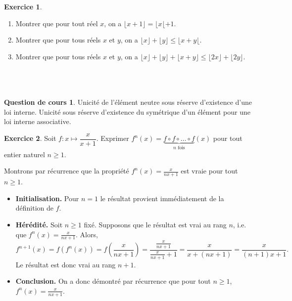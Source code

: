 \documentclass[12pt,a4paper]{amsart}
\theoremstyle{definition}
\newtheorem*{question}{\sc Question de cours}
\newtheorem{exercice}{\sc Exercice}[section]
\begin{document}
\begin{exercice}\leavevmode
	\begin{enumerate}
		\item Montrer que pour tout réel $x$, on a $\lfloor x+1 \rfloor = \lfloor x \lfloor +1$.
		\item Montrer que pour tous réels $x$ et $y$, on a $\lfloor x \rfloor + \lfloor y \rfloor \leqslant \lfloor x +y\lfloor $.
		\item Montrer que pour tous réels $x$ et $y$, on a $\lfloor x \rfloor + \lfloor y \rfloor + \lfloor x+y \rfloor \leqslant \lfloor 2x \rfloor + \lfloor 2y \rfloor$.
	\end{enumerate}
\end{exercice}


~
\newpage
\section{}
\subsection{}

\begin{question}
	Unicité de l'élément neutre sous réserve d'existence d'une loi interne. Unicité sous réserve d'existence du symétrique d'un élément pour une loi interne associative.
\end{question}

\begin{exercice}
	Soit $f\colon x \mapsto \dfrac{x}{x+1}$. Exprimer $f^n(x) = \underbrace{f\circ f \circ \ldots \circ f}_{n\text{ fois}}(x)$ pour tout entier naturel $n \geqslant 1$.
	\end{exercice}
	
	\begin{solution}
	Montrons par récurrence que la propriété $f^n(x) = \frac{x}{nx+1}$ est vraie pour tout $n \geqslant 1$.
	\begin{itemize}
	\item \textbf{Initialisation.} Pour $n=1$ le résultat provient immédiatement de la définition de $f$.
	\item \textbf{Hérédité.} Soit $n \geqslant 1$ fixé. Supposons que le résultat est vrai au rang $n$, i.e. que $f^n(x) = \frac{x}{nx+1}$. Alors,
	\[ f^{n+1}(x) = f(f^n(x)) = f \left( \frac{x}{nx+1} \right) = \frac{\frac{x}{nx+1}}{\frac{x}{nx+1} +1 } = \frac{x}{x+(nx+1)} = \frac{x}{(n+1)x+1}.\]
	Le résultat est donc vrai au rang $n+1$.
	\item \textbf{Conclusion.} On a donc démontré par récurrence que pour tout $n \geqslant 1$, $f^n(x) = \frac{x}{nx+1}$.
	\end{itemize}
	\end{solution}
	
\end{document}

